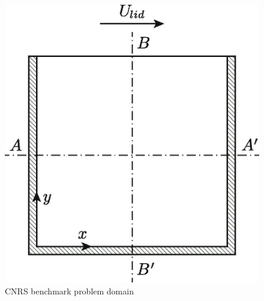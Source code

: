 \begin{frame}[noframenumbering]
\begin{columns}
\begin{figure}
      \includegraphics[width=\columnwidth]{../images/cnrs-geometry}
      \caption{CNRS benchmark problem domain \cite{tiberga_results_2020}}
    \end{figure}
  \end{columns}
\end{frame}

